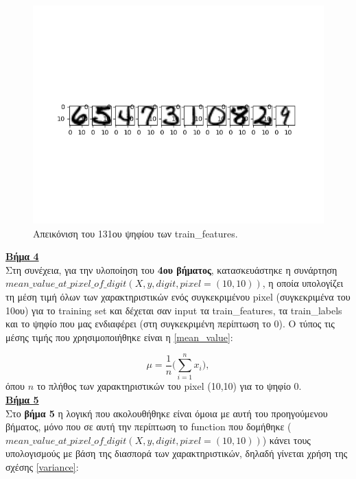 \documentclass[11pt]{article} %
\begin{document}
\begin{figure}[H]
    \centering
    \includegraphics[width=1.1\textwidth]{plots/Step 3}
    \caption{Απεικόνιση του 131ου ψηφίου των train\_features.}
    \label{fig:step_3}
\end{figure}

\underline{\textbf{Βήμα 4}}\\

Στη συνέχεια, για την υλοποίηση του \textbf{4ου βήματος}, κατασκευάστηκε η συνάρτηση $mean\_value\_at\_pixel\_of\_digit(X, y, digit, pixel=(10, 10))$, η οποία υπολογίζει τη μέση τιμή όλων των χαρακτηριστικών ενός συγκεκριμένου pixel (συγκεκριμένα του 10ου) για το training set και δέχεται σαν input  τα train\_features, τα train\_labels και το ψηφίο που μας ενδιαφέρει (στη συγκεκριμένη περίπτωση το 0). Ο τύπος τις μέσης τιμής που χρησιμοποιήθηκε είναι η \ref{mean_value}: 

\begin{equation}
\label{mean_value}
\mu = \frac{1}{n}\bigg(\sum_{i=1}^{n}x_{i}\bigg),
\end{equation}
όπου $n$ το πλήθος των χαρακτηριστικών του pixel (10,10) για το ψηφίο 0.
\\

\underline{\textbf{Βήμα 5}}\\

Στο \textbf{βήμα 5} η λογική που ακολουθήθηκε είναι όμοια με αυτή του προηγούμενου βήματος, μόνο που σε αυτή την περίπτωση το function που δομήθηκε ($mean\_value\_at\_pixel\_of\_digit(X, y, digit, pixel=(10, 10))$) κάνει τους υπολογισμούς με βάση της διασπορά των χαρακτηριστικών, δηλαδή γίνεται χρήση της σχέσης \ref{variance}: 
\end{document}
